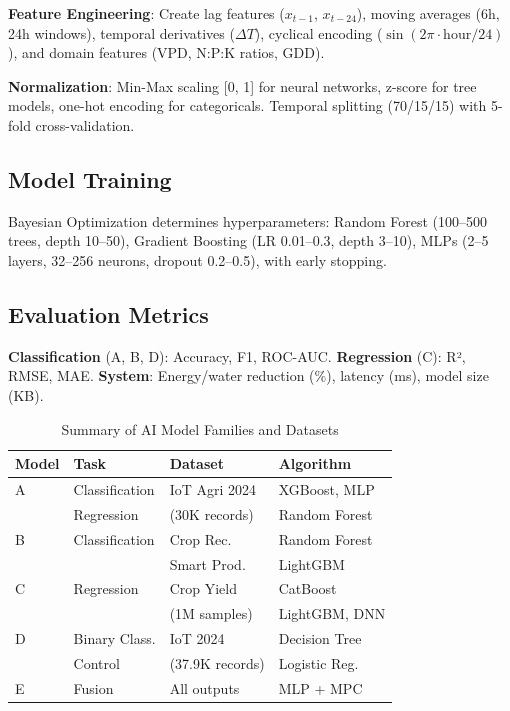 \documentclass[conference]{IEEEtran}
\begin{document}
\textbf{Feature Engineering}: Create lag features ($x_{t-1}$, $x_{t-24}$), moving averages (6h, 24h windows), temporal derivatives ($\Delta T$), cyclical encoding ($\sin(2\pi \cdot \text{hour}/24)$), and domain features (VPD, N:P:K ratios, GDD).

\textbf{Normalization}: Min-Max scaling [0, 1] for neural networks, z-score for tree models, one-hot encoding for categoricals. Temporal splitting (70/15/15) with 5-fold cross-validation.

\subsection{Model Training}

Bayesian Optimization determines hyperparameters: Random Forest (100--500 trees, depth 10--50), Gradient Boosting (LR 0.01--0.3, depth 3--10), MLPs (2--5 layers, 32--256 neurons, dropout 0.2--0.5), with early stopping.

\subsection{Evaluation Metrics}

\textbf{Classification} (A, B, D): Accuracy, F1, ROC-AUC. \textbf{Regression} (C): R², RMSE, MAE. \textbf{System}: Energy/water reduction (\%), latency (ms), model size (KB).

\begin{table}[!t]
\caption{Summary of AI Model Families and Datasets}
\centering
\small
\begin{tabular}{|l|l|l|l|}
\hline
\textbf{Model} & \textbf{Task} & \textbf{Dataset} & \textbf{Algorithm} \\
\hline
A & Classification & IoT Agri 2024 & XGBoost, MLP \\
 & Regression & (30K records) & Random Forest \\
\hline
B & Classification & Crop Rec. & Random Forest \\
 &  & Smart Prod. & LightGBM \\
\hline
C & Regression & Crop Yield & CatBoost \\
 &  & (1M samples) & LightGBM, DNN \\
\hline
D & Binary Class. & IoT 2024 & Decision Tree \\
 & Control & (37.9K records) & Logistic Reg. \\
\hline
E & Fusion & All outputs & MLP + MPC \\
\hline
\end{tabular}
\label{tab:models}
\end{table}
\end{document}

